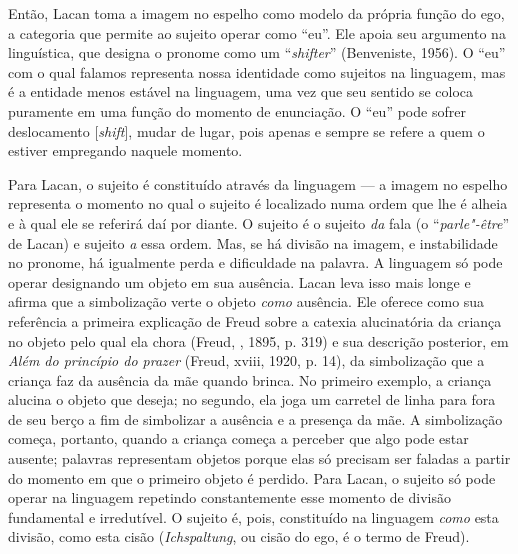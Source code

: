 Então, Lacan toma a imagem no espelho como modelo da própria função do
ego, a categoria que permite ao sujeito operar como ``eu''. Ele apoia
seu argumento na linguística, que designa o pronome como um
``\emph{shifter}'' (Benveniste, 1956). O ``eu'' com o qual falamos
representa nossa identidade como sujeitos na linguagem, mas é a entidade
menos estável na linguagem, uma vez que seu sentido se coloca puramente
em uma função do momento de enunciação. O ``eu'' pode sofrer
deslocamento {[}\emph{shift}{]}, mudar de lugar, pois apenas e sempre se
refere a quem o estiver empregando naquele momento.

Para Lacan, o sujeito é constituído através da linguagem --- a imagem no
espelho representa o momento no qual o sujeito é localizado numa ordem
que lhe é alheia e à qual ele se referirá daí por diante. O sujeito é o
sujeito \emph{da} fala (o ``\emph{parle"-être}'' de Lacan) e sujeito
\emph{a} essa ordem. Mas, se há divisão na imagem, e instabilidade no
pronome, há igualmente perda e dificuldade na palavra. A linguagem só
pode operar designando um objeto em sua ausência. Lacan leva isso mais
longe e afirma que a simbolização verte o objeto \emph{como} ausência.
Ele oferece como sua referência a primeira explicação de Freud sobre a
catexia alucinatória da criança no objeto pelo qual ela chora (Freud, ,
1895, p. 319) e sua descrição posterior, em \emph{Além do princípio do
prazer} (Freud, xviii, 1920, p. 14), da simbolização que a criança faz
da ausência da mãe quando brinca. No primeiro exemplo, a criança alucina
o objeto que deseja; no segundo, ela joga um carretel de linha para fora
de seu berço a fim de simbolizar a ausência e a presença da mãe. A
simbolização começa, portanto, quando a criança começa a perceber que
algo pode estar ausente; palavras representam objetos porque elas só
precisam ser faladas a partir do momento em que o primeiro objeto é
perdido. Para Lacan, o sujeito só pode operar na linguagem repetindo
constantemente esse momento de divisão fundamental e irredutível. O
sujeito é, pois, constituído na linguagem \emph{como} esta divisão, como
esta cisão (\emph{Ichspaltung}, ou cisão do ego, é o termo de Freud).

